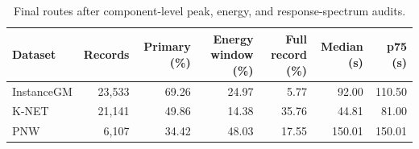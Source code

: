 \begin{table}[!htbp]
\centering
\caption{Final routes after component-level peak, energy, and response-spectrum audits.}
\label{tab:stability}
\begin{singlespace}
\footnotesize
\setlength{\tabcolsep}{3pt}
\begin{tabular}{lrrrrrr}
\toprule
Dataset & Records & Primary (\%) & Energy window (\%) & Full record (\%) & Median (s) & p75 (s) \\
\midrule
InstanceGM & 23,533 & 69.26 & 24.97 & 5.77 & 92.00 & 110.50 \\
K-NET & 21,141 & 49.86 & 14.38 & 35.76 & 44.81 & 81.00 \\
PNW & 6,107 & 34.42 & 48.03 & 17.55 & 150.01 & 150.01 \\
\bottomrule
\end{tabular}
\end{singlespace}
\end{table}
